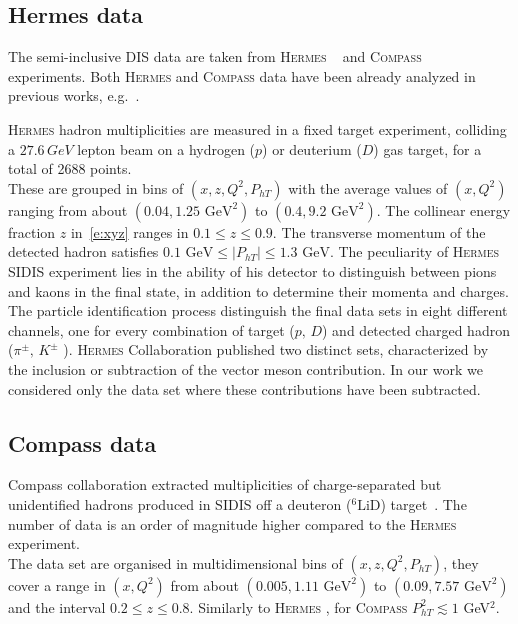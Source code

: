 \documentclass[aps,preprintnumbers,showpacs,nofootinbib,superscriptaddress,floatfix]{revtex4}
\newcommand{\hermes}{\textsc{Hermes }}
\newcommand{\compass}{\textsc{Compass }}
\newcommand{\Tperp}{T}
\begin{document}
\subsection{Hermes data}
\label{ss:hermes}

The semi-inclusive DIS data are taken from \hermes~\cite{Airapetian:2012ki} and \compass~\cite{Adolph:2013stb} experiments. 
Both \hermes and \compass data have been already analyzed in previous works, e.g.~\cite{Signori:2013mda,Anselmino:2013lza}.

\hermes hadron multiplicities are measured in a fixed target experiment, colliding a $27.6\,GeV$ lepton beam on a hydrogen ($p$) or deuterium ($D$) gas target, for a total of 2688 points.\\
These are grouped in bins of $(x,z,Q^2,P_{hT})$ with the average values of $(x,Q^2)$ ranging from about $(0.04, 1.25\text{ GeV}^2)$ to $(0.4, 9.2\text{ GeV}^2)$. 
The collinear energy fraction $z$ in~\eqref{e:xyz} ranges in $0.1\leq z\leq 0.9$. The transverse momentum of the detected hadron satisfies $0.1 \text{ GeV} \leq \vert P_{hT} \vert \leq 1.3 \text{ GeV}$.
The peculiarity of \hermes SIDIS experiment lies in the ability of his detector to distinguish between pions and kaons in the final state, in addition to determine their momenta and charges.
The particle identification process distinguish the final data sets in eight different channels, one for every combination of target ($p,\,D$) and detected charged hadron ($\pi^\pm, \,  K^\pm$ ).
\hermes Collaboration published two distinct sets, characterized by the inclusion or subtraction of the vector meson contribution. In our work we considered only the data set where these contributions have been subtracted. \\


\subsection{Compass data}
\label{ss:compass}

Compass collaboration extracted multiplicities of charge-separated but unidentified hadrons produced in SIDIS off a deuteron ($^6\text{LiD}$) target~\cite{Adolph:2013stb}.  The number of data is an order of magnitude higher compared to the \hermes experiment. \\
The data set are organised in multidimensional bins of $(x,z,Q^2,P_{h\Tperp})$, they cover a range in $(x,Q^2)$ from about $(0.005, 1.11\text{ GeV}^2)$ to $(0.09, 7.57\text{ GeV}^2)$ and the interval $0.2 \leq z \leq 0.8$. Similarly to \hermes, for \compass $P_{h\Tperp}^2 \lesssim 1$ GeV$^2$. 
\end{document}
